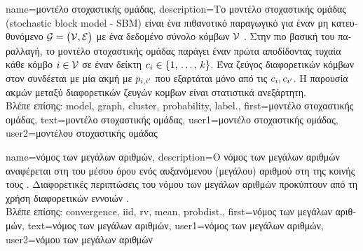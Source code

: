 {name={\foreignlanguage{greek}{μοντέλο στοχαστικής ομάδας}},
	description={\foreignlanguage{greek}{Το μοντέλο στοχαστικής ομάδας}
		(sto\-chastic block model - SBM) \foreignlanguage{greek}{είναι ένα πιθανοτικό παραγωγικό}  
		\foreignlanguage{greek}{για έναν μη κατευθυνόμενο}  $\mathcal{G} = \big( \mathcal{V}, \mathcal{E} \big)$ 
		\foreignlanguage{greek}{με ένα δεδομένο σύνολο κόμβων} $\mathcal{V}$ \cite{AbbeSBM2018}. \foreignlanguage{greek}{Στην πιο 
		βασική του παραλλαγή, το μοντέλο στοχαστικής ομάδας παράγει έναν}  
		\foreignlanguage{greek}{πρώτα αποδίδοντας τυχαία κάθε κόμβο $i \in \mathcal{V}$ σε έναν δείκτη} 
		 $c_{i} \in \{1, \,\ldots, \,k\}$. \foreignlanguage{greek}{Ένα ζεύγος διαφορετικών 
		κόμβων στον}  \foreignlanguage{greek}{συνδέεται με μία ακμή με}  $p_{i,i'}$ 
		\foreignlanguage{greek}{που εξαρτάται μόνο από τις}  $c_{i}, c_{i'}$. 
		\foreignlanguage{greek}{Η παρουσία ακμών μεταξύ διαφορετικών ζευγών κομβων είναι στατιστικά ανεξάρτητη.} \\
		\foreignlanguage{greek}{Βλέπε επίσης:} \gls{model}, \gls{graph}, \gls{cluster}, \gls{probability}, \gls{label}.},
	first={\foreignlanguage{greek}{μοντέλο στοχαστικής ομάδας}},
	text={\foreignlanguage{greek}{μοντέλο στοχαστικής ομάδας}},
	user1={\foreignlanguage{greek}{μοντέλο στοχαστικής ομάδας}}, %
    	user2={\foreignlanguage{greek}{μοντέλου στοχαστικής ομάδας}} %
}

{name={\foreignlanguage{greek}{νόμος των μεγάλων αριθμών}},
	description={\foreignlanguage{greek}{Ο νόμος των μεγάλων αριθ\-μών} 
		\foreignlanguage{greek}{αναφέρεται στη}  \foreignlanguage{greek}{του μέσου όρου ενός αυξανόμενου 
		(μεγάλου) αριθ\-μού}   \foreignlanguage{greek}{στη}  \foreignlanguage{greek}{της 
		κοινής τους} . \foreignlanguage{greek}{Διαφορετικές περιπτώσεις του νόμου των μεγάλων αριθμών 
		προκύπτουν από τη χρήση διαφορετικών εννοιών}  \cite{papoulis}.\\
		\foreignlanguage{greek}{Βλέπε επίσης:} \gls{convergence}, \gls{iid}, \gls{rv}, \gls{mean}, \gls{probdist}.},
	first={\foreignlanguage{greek}{νόμος των μεγάλων αριθμών}},
	text={\foreignlanguage{greek}{νόμος των μεγάλων αριθμών}},
	user1={\foreignlanguage{greek}{νόμος των μεγάλων αριθμών}}, %
	user2={\foreignlanguage{greek}{νόμου των μεγάλων αριθμών}} %
}

